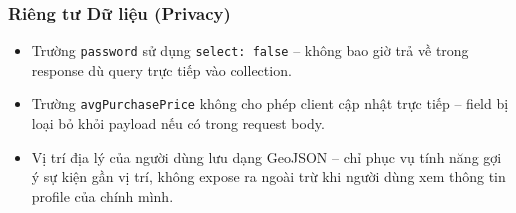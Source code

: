 \subsubsection{Riêng tư Dữ liệu (Privacy)}

\begin{itemize}[leftmargin=*, label={--}]
    \item Trường \texttt{password} sử dụng \texttt{select: false} --
    không bao giờ trả về trong response dù query trực tiếp vào collection.

    \item Trường \texttt{avgPurchasePrice} không cho phép client cập nhật
    trực tiếp -- field bị loại bỏ khỏi payload nếu có trong request body.

    \item Vị trí địa lý của người dùng lưu dạng GeoJSON -- chỉ phục vụ
    tính năng gợi ý sự kiện gần vị trí, không expose ra ngoài trừ khi
    người dùng xem thông tin profile của chính mình.
\end{itemize}


